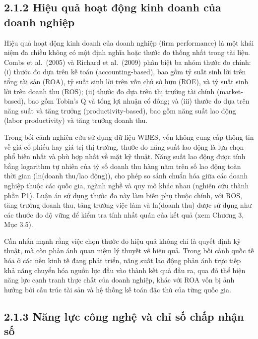 \documentclass[
  a4paper,
  13pt]{extreport}
\begin{document}
\hypertarget{hiux1ec7u-quux1ea3-houx1ea1t-ux111ux1ed9ng-kinh-doanh-cux1ee7a-doanh-nghiux1ec7p}{%
\subsection{2.1.2 Hiệu quả hoạt động kinh doanh của doanh
nghiệp}\label{hiux1ec7u-quux1ea3-houx1ea1t-ux111ux1ed9ng-kinh-doanh-cux1ee7a-doanh-nghiux1ec7p}}

Hiệu quả hoạt động kinh doanh của doanh nghiệp (firm performance) là một
khái niệm đa chiều không có một định nghĩa hoặc thước đo thống nhất
trong tài liệu. Combs et al.~(2005) và Richard et al.~(2009) phân biệt
ba nhóm thước đo chính: (i) thước đo dựa trên kế toán
(accounting-based), bao gồm tỷ suất sinh lời trên tổng tài sản (ROA), tỷ
suất sinh lời trên vốn chủ sở hữu (ROE), và tỷ suất sinh lời trên doanh
thu (ROS); (ii) thước đo dựa trên thị trường tài chính (market-based),
bao gồm Tobin's Q và tổng lợi nhuận cổ đông; và (iii) thước đo dựa trên
năng suất và tăng trưởng (productivity-based), bao gồm năng suất lao
động (labor productivity) và tăng trưởng doanh thu.

Trong bối cảnh nghiên cứu sử dụng dữ liệu WBES, vốn không cung cấp thông
tin về giá cổ phiếu hay giá trị thị trường, thước đo năng suất lao động
là lựa chọn phổ biến nhất và phù hợp nhất về mặt kỹ thuật. Năng suất lao
động được tính bằng logarithm tự nhiên của tỷ số doanh thu hàng năm trên
số lao động toàn thời gian (ln(doanh thu/lao động)), cho phép so sánh
chuẩn hóa giữa các doanh nghiệp thuộc các quốc gia, ngành nghề và quy mô
khác nhau (nghiên cứu thành phần P1). Luận án sử dụng thước đo này làm
biến phụ thuộc chính, với ROS, tăng trưởng doanh thu, tăng trưởng việc
làm và ln(doanh thu) được sử dụng như các thước đo độ vững để kiểm tra
tính nhất quán của kết quả (xem Chương 3, Mục 3.5).

Cần nhấn mạnh rằng việc chọn thước đo hiệu quả không chỉ là quyết định
kỹ thuật, mà còn phản ánh quan niệm lý thuyết về hiệu quả. Trong bối
cảnh quốc tế hóa ở các nền kinh tế đang phát triển, năng suất lao động
phản ánh trực tiếp khả năng chuyển hóa nguồn lực đầu vào thành kết quả
đầu ra, qua đó thể hiện năng lực cạnh tranh thực chất của doanh nghiệp,
khác với ROA vốn bị ảnh hưởng bởi cấu trúc tài sản và hệ thống kế toán
đặc thù của từng quốc gia.

\hypertarget{nux103ng-lux1ef1c-cuxf4ng-nghux1ec7-vuxe0-chux1ec9-sux1ed1-chux1ea5p-nhux1eadn-sux1ed1}{%
\subsection{2.1.3 Năng lực công nghệ và chỉ số chấp nhận
số}\label{nux103ng-lux1ef1c-cuxf4ng-nghux1ec7-vuxe0-chux1ec9-sux1ed1-chux1ea5p-nhux1eadn-sux1ed1}}
\end{document}
